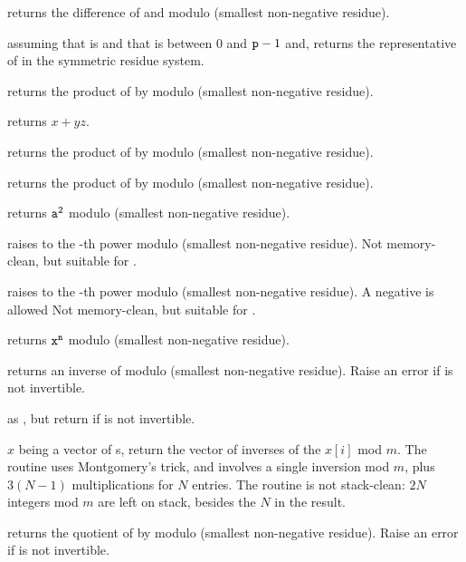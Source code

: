  returns the difference of  and
 modulo  (smallest non-negative residue).

 assuming that  is
 and that  is between $0$ and ${\tt p} - 1$ and,
returns the representative of  in the symmetric residue system.

 returns the product of  by
 modulo  (smallest non-negative residue).

 returns $x + yz$.

 returns the product of  by
 modulo  (smallest non-negative residue).

 returns the product of  by
 modulo  (smallest non-negative residue).

 returns ${\tt a}^2$ modulo  (smallest
non-negative residue).

 raises  to the -th
power modulo  (smallest non-negative residue). Not memory-clean, but
suitable for .

 raises  to the -th
power modulo  (smallest non-negative residue). A negative  is
allowed Not memory-clean, but suitable for .

 returns ${\tt x}^{\tt n}$
modulo  (smallest non-negative residue).

 returns an inverse of  modulo 
(smallest non-negative residue). Raise an error if  is not invertible.

 as , but return
 if  is not invertible.

 $x$ being a vector of s, return
the vector of inverses of the $x[i]$ mod $m$. The routine uses Montgomery's
trick, and involves a single inversion mod $m$, plus $3(N-1)$ multiplications
for $N$ entries. The routine is not stack-clean: $2N$ integers mod $m$
are left on stack, besides the $N$ in the result.

 returns the quotient of  by
 modulo  (smallest non-negative residue). Raise an error if
 is not invertible.

